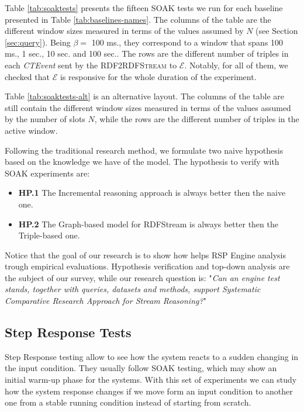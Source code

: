 Table \ref{tab:soaktests} presents the fifteen SOAK tests we run for each baseline presented in Table \ref{tab:baselines-names}. The columns of the table are the different window sizes measured in terms of the values assumed by $N$ (see Section \ref{sec:query}).  Being $\beta=$ 100 ms., they correspond to a window that spans 100 ms., 1 sec., 10 sec. and 100 sec.. The rows are the different number of triples in each \textit{CTEvent} sent by the \textsc{RDF2RDFStream} to $\mathcal{E}$. Notably, for all of them, we checked that $\mathcal{E}$ is responsive for the whole duration of the experiment. 

Table \ref{tab:soaktests-alt} is an alternative layout. The columns of the table are still contain the different window sizes measured in terms of the values assumed by the number of slots $N$, while the rows are the different number of triples in the active window. 

Following the traditional research method, we formulate two naive hypothesis based on the knowledge we have of the model. The hypothesis to verify with SOAK experiments are:
\begin{itemize}
\item \textbf{HP.1} The Incremental reasoning approach is always better then the naive one.
\item \textbf{HP.2} The Graph-based model for RDFStream is always better then the Triple-based one.
\end{itemize}

Notice that the goal of our research is to show how \name helps RSP Engine analysis trough empirical evaluations. Hypothesis verification and top-down analysis are the subject of our survey, while our research question is:  "\textit{Can an engine test stands, together with queries, datasets and methods, support Systematic Comparative Research Approach for Stream Reasoning?}" %

\subsection{Step Response Tests}\label{sec:step-es}

Step Response testing allow to see how the system reacts to a sudden changing in the input condition. They usually follow SOAK testing, which may show an initial warm-up phase for the systems. With this set of experiments we can study how the system response changes if we move form an input condition to another one from a stable running condition instead of starting from scratch.

